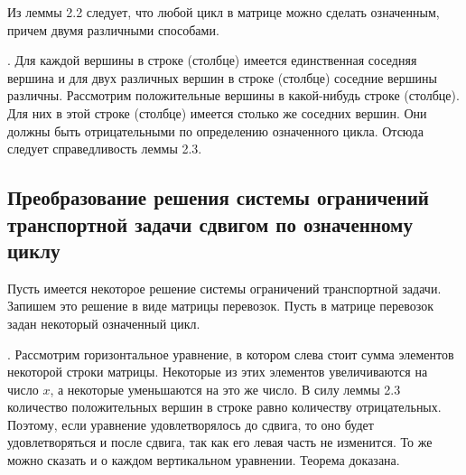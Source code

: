 Из леммы 2.2 следует, что любой цикл в матрице можно сделать означенным, причем двумя различными способами.%


. Для каждой вершины в строке (столбце) имеется единственная соседняя вершина и для двух различных вершин в строке (столбце) соседние вершины различны. Рассмотрим положительные вершины в какой-нибудь строке (столбце). Для них в этой строке (столбце) имеется столько же соседних вершин. Они должны быть отрицательными по определению означенного цикла. Отсюда следует справедливость леммы 2.3.%
\subsection{Преобразование решения системы ограничений транспортной задачи сдвигом по означенному циклу}

Пусть имеется некоторое решение системы ограничений транспортной задачи. Запишем это решение в виде матрицы перевозок. Пусть в матрице перевозок задан некоторый означенный цикл.



. Рассмотрим горизонтальное уравнение, в котором слева стоит сумма элементов некоторой строки матрицы. Некоторые из этих элементов увеличиваются на число $x$, а некоторые уменьшаются на это же число. В силу леммы 2.3 количество положительных вершин в строке равно количеству отрицательных. Поэтому, если уравнение удовлетворялось до сдвига, то оно будет удовлетворяться и после сдвига, так как его левая часть не изменится. То же можно сказать и о каждом вертикальном уравнении. Теорема доказана.%



